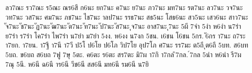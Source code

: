 {ลว7ณะ
รว7ณะ
ร5ณะ
ณร6สี
ก6นะ
ยก7นะ
ค7นะ
ย7นะ
ภว7นะ
มท7นะ
รต7นะ
ลว7นะ
วจ7นะ
วท7นะ
วส7นะ
ศม7นะ
ภช7นะ
ไช7นะ
าลป7นะ
รรธ7นะ
สธ5นะ
โสธ6นะ
สว5นะ
เสว6นะ
สาว7นะ
ัจ7นะ
ัช7นะ
ัฏ7นะ
ัฒ7นะ
ัต7นะ
ัท7นะ
ัป7นะ
ัส7นะ
ุจ7นะ
อาส7นะ
ุ7นะ
5ผี
7จำ
5งำ
ห6งำ
น7รำ
ย7รำ
ร7รำ
โค7รำ
ไพ7รำ
น7ยำ
ม7ยำ
5งง.
ห6งง
น7งก
5ชน.
เ6ชน
โ6ชน
5กร.
ั6กร
า7นะ
ถ7ระ
า7ยก.
า7ยน.
า7ฐี
า7นี
า7วี
ป5โ
ป6โย
ป6โภ
วิป7โย
อุป7โภ
ศ7นะ
รร7มะ
ต5ถี
ุต6ถี
5บท.
ส6บท
5บถ.
ข6บถ
ส6บถ
7ฟู
7ษุ
5ตะ.
ค6ตะ
ร6ตะ
สร7ตะ
มิ7ผ
า7กิ
า7กล
ิ7กล.
์7กล
5นำ
ห6นำ
รี7ผ
7ณุ
5นี.
ห6นี
ฉ6นี
าร6นี
วีช6นี
สส6นี
มท6นี
รม6นี
น7ยิ
}
